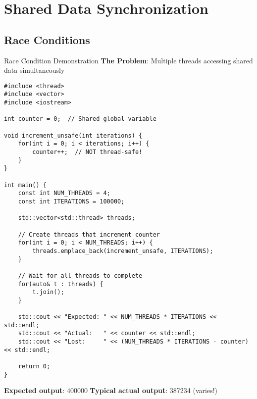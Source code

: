\section{Shared Data Synchronization}

\subsection{Race Conditions}
\begin{frame}[fragile]{ Race Condition Demonstration}
	\textbf{The Problem}: Multiple threads accessing shared data simultaneously

	\begin{verbatim}
#include <thread>
#include <vector>
#include <iostream>

int counter = 0;  // Shared global variable

void increment_unsafe(int iterations) {
    for(int i = 0; i < iterations; i++) {
        counter++;  // NOT thread-safe!
    }
}

int main() {
    const int NUM_THREADS = 4;
    const int ITERATIONS = 100000;

    std::vector<std::thread> threads;

    // Create threads that increment counter
    for(int i = 0; i < NUM_THREADS; i++) {
        threads.emplace_back(increment_unsafe, ITERATIONS);
    }

    // Wait for all threads to complete
    for(auto& t : threads) {
        t.join();
    }

    std::cout << "Expected: " << NUM_THREADS * ITERATIONS << std::endl;
    std::cout << "Actual:   " << counter << std::endl;
    std::cout << "Lost:     " << (NUM_THREADS * ITERATIONS - counter) << std::endl;

    return 0;
}
	\end{verbatim}

	\textbf{Expected output}: 400000 \quad \textbf{Typical actual output}: 387234 (varies!)
\end{frame}

